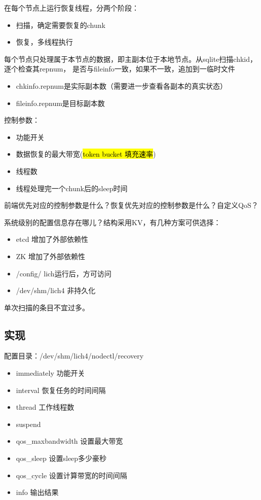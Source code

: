 在每个节点上运行恢复线程，分两个阶段：
\begin{itemize}
\item 扫描，确定需要恢复的chunk
\item 恢复，多线程执行
\end{itemize}

每个节点只处理属于本节点的数据，即主副本位于本地节点。从sqlite扫描chkid，逐个检查其repnum，
是否与fileinfo一致，如果不一致，追加到一临时文件
\begin{itemize}
\item chkinfo.repnum是实际副本数（需要进一步查看各副本的真实状态）
\item fileinfo.repnum是目标副本数
\end{itemize}

控制参数：
\begin{itemize}
\item 功能开关
\item 数据恢复的最大带宽(\hl{token bucket 填充速率})
\item 线程数
\item 线程处理完一个chunk后的sleep时间
\end{itemize}

前端优先对应的控制参数是什么？恢复优先对应的控制参数是什么？自定义QoS？

系统级别的配置信息存在哪儿？结构采用KV，有几种方案可供选择：
\begin{itemize}
\item etcd           增加了外部依赖性
\item ZK             增加了外部依赖性
\item /config/       lich运行后，方可访问
\item /dev/shm/lich4 非持久化
\end{itemize}

单次扫描的条目不宜过多。

\subsection{实现}

配置目录：/dev/shm/lich4/nodectl/recovery

\begin{itemize}
\item immediately       功能开关
\item interval          恢复任务的时间间隔
\item thread            工作线程数
\item suspend
\item qos\_maxbandwidth 设置最大带宽
\item qos\_sleep        设置sleep多少豪秒
\item qos\_cycle        设置计算带宽的时间间隔
\item info              输出结果
\end{itemize}

